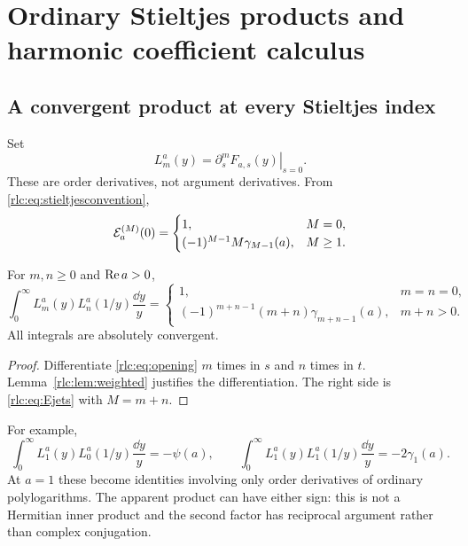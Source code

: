 \section{Ordinary Stieltjes products and harmonic coefficient calculus}
\label{rlc:sec:stieltjes}

\subsection{A convergent product at every Stieltjes index}
Set
\begin{equation}\label{rlc:eq:Ljets}
 L_m^a(y)=\left.\partial_s^mF_{a,s}(y)\right|_{s=0}.
\end{equation}
These are order derivatives, not argument derivatives. From
\eqref{rlc:eq:stieltjesconvention},
\begin{equation}\label{rlc:eq:Ejets}
 \mathcal E_a^{(M)}(0)=
 \begin{cases}
 1,&M=0,\\
 (-1)^{M-1}M\gamma_{M-1}(a),&M\ge1.
 \end{cases}
\end{equation}

\begin{theorem}
\label{rlc:thm:stieltjes}
For $m,n\ge0$ and $\operatorname{Re} a>0$,
\begin{equation}\label{rlc:eq:stieltjespair}
 \boxed{\displaystyle
 \int_0^\infty L_m^a(y)L_n^a(1/y)\frac{\dd y}{y}
 =\begin{cases}
 1,&m=n=0,\\
 (-1)^{m+n-1}(m+n)\gamma_{m+n-1}(a),&m+n>0.
 \end{cases}}
\end{equation}
All integrals are absolutely convergent.
\end{theorem}
\begin{proof}
Differentiate \eqref{rlc:eq:opening} $m$ times in $s$ and $n$ times
in $t$. Lemma~\ref{rlc:lem:weighted} justifies the differentiation.
The right side is \eqref{rlc:eq:Ejets} with $M=m+n$.
\end{proof}

For example,
\[
 \int_0^\infty L_1^a(y)L_0^a(1/y)\frac{\dd y}{y}
 =-\psi(a),\qquad
 \int_0^\infty L_1^a(y)L_1^a(1/y)\frac{\dd y}{y}
 =-2\gamma_1(a).
\]
At $a=1$ these become identities involving only order derivatives
of ordinary polylogarithms. The apparent product can have either sign:
this is not a Hermitian inner product and the second factor has
reciprocal argument rather than complex conjugation.

